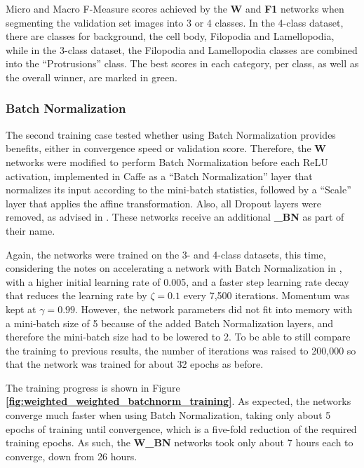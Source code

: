 \begin {table}
\caption[Micro and Macro F-Measure scores for networks with weighted Cross-Entropy and F-Measure loss functions.]{Micro and Macro F-Measure scores achieved by the \textbf{W} and \textbf{F1} networks when segmenting the validation set images into 3 or 4 classes. In the 4-class dataset, there are classes for background, the cell body, Filopodia and Lamellopodia, while in the 3-class dataset, the Filopodia and Lamellopodia classes are combined into the ``Protrusions'' class. The best scores in each category, per class, as well as the overall winner, are marked in green.}
\label{tab:results1}
\end {table}


	\subsubsection{Batch Normalization}

\noindent The second training case tested whether using Batch Normalization provides benefits, either in convergence speed or validation score. Therefore, the \textbf{W} networks were modified to perform Batch Normalization before each ReLU activation, implemented in Caffe as a ``Batch Normalization'' layer that normalizes its input according to the mini-batch statistics, followed by a ``Scale'' layer that applies the affine transformation. Also, all Dropout layers were removed, as advised in \cite{batchnorm}. These networks receive an additional \textbf{\_BN} as part of their name.

Again, the networks were trained on the 3- and 4-class datasets, this time, considering the notes on accelerating a network with Batch Normalization in \cite{batchnorm}, with a higher initial learning rate of 0.005, and a faster step learning rate decay that reduces the learning rate by $\zeta = 0.1$ every 7,500 iterations. Momentum was kept at $\gamma = 0.99$. However, the network parameters did not fit into memory with a mini-batch size of 5 because of the added Batch Normalization layers, and therefore the mini-batch size had to be lowered to 2. To be able to still compare the training to previous results, the number of iterations was raised to 200,000 so that the network was trained for about 32 epochs as before.

The training progress is shown in Figure \textbf{\ref{fig:weighted_weighted_batchnorm_training}}. As expected, the networks converge much faster when using Batch Normalization, taking only about 5 epochs of training until convergence, which is a five-fold reduction of the required training epochs. As such, the \textbf{W\_BN} networks took only about 7 hours each to converge, down from 26 hours.\\



